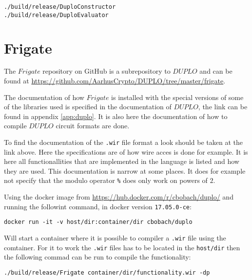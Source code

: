 \documentclass[twoside,11pt,openright]{report}
\begin{document}
\begin{appendices}
\begin{center}
\begin{verbatim}
./build/release/DuploConstructor 
./build/release/DuploEvaluator
\end{verbatim}
\end{center}


\section{Frigate}
\label{app:frigate}
The $Frigate$ repository on GitHub is a subrepository to $DUPLO$ and can be found at \url{https://github.com/AarhusCrypto/DUPLO/tree/master/frigate}.

The documentation of how $Frigate$ is installed with the special versions of some of the libraries used is specified in the documentation of $DUPLO$, the link can be found in appendix \ref{app:duplo}. It is also here the documentation of how to compile $DUPLO$ circuit formats are done.

To find the documentation of the \verb|.wir| file format a look should be taken at the link above. Here the specifications are of how wire acces is done for example. It is here all functionallities that are implemented in the language is listed and how they are used. This documentation is narrow at some places. It does for example not specify that the modulo operator \verb|%| does only work on powers of $2$.

\bigskip

Using the docker image from \url{https://hub.docker.com/r/cbobach/duplo/} and running the followint command, in docker version \verb|17.05.0-ce|:

\begin{center}
\begin{verbatim}
docker run -it -v host/dir:container/dir cbobach/duplo
\end{verbatim}
\end{center}

Will start a container where it is possible to compiler a \verb|.wir| file using the comtainer. For it to work the \verb|.wir| files has to be located in the \verb|host/dir| then the following commad can be run to compile the functionality:

\begin{center}
\begin{verbatim}
./build/release/Frigate container/dir/functionality.wir -dp
\end{verbatim}
\end{center}


\end{appendices}
\end{document}
